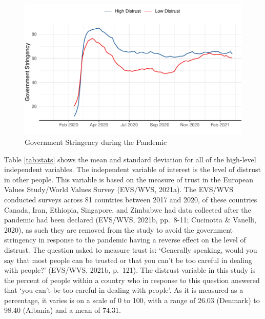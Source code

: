 \documentclass[
  11pt,
]{article}
\begin{document}
\begin{figure}
\includegraphics[width=0.8\linewidth]{write_up_test_files/figure-latex/stringency-plot-1} \caption{Government Stringency during the Pandemic}\label{fig:stringency-plot}
\end{figure}

Table \ref{tab:stats} shows the mean and standard deviation for all of the high-level independent variables. The independent variable of interest is the level of distrust in other people. This variable is based on the measure of trust in the European Values Study/World Values Survey (EVS/WVS, 2021a). The EVS/WVS conducted surveys across 81 countries between 2017 and 2020, of these countries Canada, Iran, Ethiopia, Singapore, and Zimbabwe had data collected after the pandemic had been declared (EVS/WVS, 2021b, pp.~8-11; Cucinotta \& Vanelli, 2020), as such they are removed from the study to avoid the government stringency in response to the pandemic having a reverse effect on the level of distrust. The question asked to measure trust is: `Generally speaking, would you say that most people can be trusted or that you can't be too careful in dealing with people?' (EVS/WVS, 2021b, p.~121). The distrust variable in this study is the percent of people within a country who in response to this question answered that `you can't be too careful in dealing with people'. As it is measured as a percentage, it varies is on a scale of 0 to 100, with a range of 26.03 (Denmark) to 98.40 (Albania) and a mean of 74.31.\\
~\\
\end{document}
